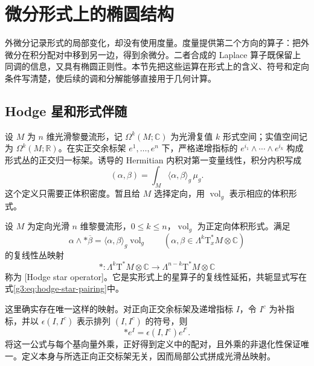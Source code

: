 
% 
% 

\section{微分形式上的椭圆结构}
\label{g3:sec:1501}

外微分记录形式的局部变化，却没有使用度量。度量提供第二个方向的算子：把外微分在积分配对中移到另一边，得到余微分。二者合成的 Laplace 算子既保留上同调的信息，又具有椭圆正则性。本节先把这些运算在形式上的含义、符号和定向条件写清楚，使后续的调和分解能够直接用于几何计算。

\subsection{Hodge 星和形式伴随}
\label{g3:subsec:1501:01}
设 \(M\) 为 \(n\) 维光滑黎曼流形，记 \(\Omega^k(M;\mathbb C)\) 为光滑复值 \(k\) 形式空间；实值空间记为 \(\Omega^k(M;\mathbb R)\)。在实正交余标架 \(e^1,\ldots,e^n\) 下，严格递增指标的 \(e^{i_1}\wedge\cdots\wedge e^{i_k}\) 构成形式丛的正交归一标架。诱导的 Hermitian 内积对第一变量线性，积分内积写成
\[
	(\alpha,\beta)=\int_M\langle\alpha,\beta\rangle_g\,\mu_g.
\]
这个定义只需要正体积密度。暂且给 \(M\) 选择定向，用 \(\operatorname{vol}_g\) 表示相应的体积形式。

\begin{definition}\label{g3:def:form-hodge-star}
	设 \(M\) 为定向光滑 \(n\) 维黎曼流形，\(0\le k\le n\)，\(\operatorname{vol}_g\) 为正定向体积形式。满足
	\begin{equation}\label{g3:eq:hodge-star-pairing}
		\alpha\wedge *\overline\beta
		=\langle\alpha,\beta\rangle_g\operatorname{vol}_g
		\qquad(\alpha,\beta\in\Lambda^k\mathrm T_x^*M\otimes\mathbb C)
	\end{equation}
	的复线性丛映射
	\[
		*:\Lambda^k\mathrm T^*M\otimes\mathbb C
		\longrightarrow\Lambda^{n-k}\mathrm T^*M\otimes\mathbb C
	\]
	称为 [Hodge star operator]。它是实形式上的星算子的复线性延拓，共轭显式写在式\eqref{g3:eq:hodge-star-pairing}中。
\end{definition}

这里确实存在唯一这样的映射。对正向正交余标架及递增指标 \(I\)，令 \(I^c\) 为补指标，并以 \(\epsilon(I,I^c)\) 表示排列 \((I,I^c)\) 的符号，则
\[
	*e^I=\epsilon(I,I^c)e^{I^c}.
\]
将这一公式与每个基向量外乘，正好得到定义中的配对，且外乘的非退化性保证唯一。定义本身与所选正向正交标架无关，因而局部公式拼成光滑丛映射。

